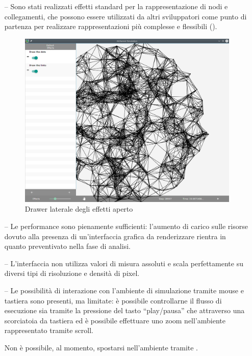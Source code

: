 \begin{itemize}
                  \item[--]
                      Sono stati realizzati effetti standard per la rappresentazione di nodi e collegamenti, che possono essere utilizzati da altri sviluppatori come punto di partenza per realizzare rappresentazioni più complesse e flessibili ().

                      \begin{figure}[htbp]
                          \centering
                          \includegraphics[scale=0.44]{img/withNodes/simWithEff}
                          \caption{Drawer laterale degli effetti aperto}
                          \label{fig:simWithEff}
                      \end{figure}

                  \item[--]
                      Le performance sono pienamente sufficienti: l'aumento di carico sulle risorse dovuto alla presenza di un'interfaccia grafica da renderizzare rientra in quanto preventivato nella fase di analisi.
                  \item[--]
                      L'interfaccia non utilizza valori di misura assoluti e scala perfettamente su diversi tipi di risoluzione e densità di pixel.
                  \item[--]
                      Le possibilità di interazione con l'ambiente di simulazione tramite mouse e tastiera sono presenti, ma limitate: è possibile controllarne il flusso di esecuzione sia tramite la pressione del tasto ``play/pausa'' che attraverso una scorciatoia da tastiera ed è possibile effettuare uno zoom nell'ambiente rappresentato tramite scroll.

                      Non è possibile, al momento, spostarsi nell'ambiente tramite .
                \end{itemize}

